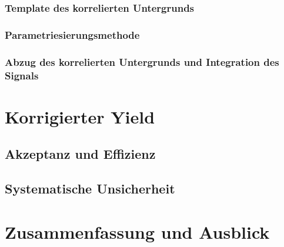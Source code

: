 \documentclass[11pt]{article}
\renewcommand{\,}{,\!} %
\begin{document}
\subsubsection{Template des korrelierten Untergrunds} \label{s3s5s2}


\subsubsection{Parametriesierungsmethode} \label{s3s5s3}


\subsubsection{Abzug des korrelierten Untergrunds und Integration des Signals} \label{s3s5s4}

\newpage
\section{Korrigierter Yield} \label{s4}

\subsection{Akzeptanz und Effizienz} \label{s4s1}


\subsection{Systematische Unsicherheit} \label{s4s2}

\newpage
\section{Zusammenfassung und Ausblick} \label{s5}

\newpage
 

\end{document}
